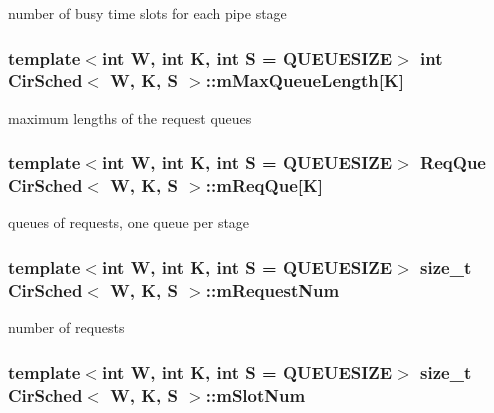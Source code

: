 number of busy time slots for each pipe stage 

\hypertarget{classCirSched_aef4a2f15ecdea422b3b3c2e271f2a41d}{
\subsubsection[{m\-Max\-Queue\-Length}]{\setlength{\rightskip}{0pt plus 5cm}template$<$int W, int K, int S = Q\-U\-E\-U\-E\-S\-I\-Z\-E$>$ int {\bf Cir\-Sched}$<$ {\bf W}, K, S $>$\-::m\-Max\-Queue\-Length\mbox{[}K\mbox{]}\hspace{0.3cm}{\ttfamily [private]}}}\label{classCirSched_aef4a2f15ecdea422b3b3c2e271f2a41d}


maximum lengths of the request queues 

\hypertarget{classCirSched_a626135d70cbd18b7031a7eed0aafabd5}{
\subsubsection[{m\-Req\-Que}]{\setlength{\rightskip}{0pt plus 5cm}template$<$int W, int K, int S = Q\-U\-E\-U\-E\-S\-I\-Z\-E$>$ {\bf Req\-Que} {\bf Cir\-Sched}$<$ {\bf W}, K, S $>$\-::m\-Req\-Que\mbox{[}K\mbox{]}}}\label{classCirSched_a626135d70cbd18b7031a7eed0aafabd5}


queues of requests, one queue per stage 

\hypertarget{classCirSched_acd7ba9fa2e160b2fea6e5600820f93f6}{
\subsubsection[{m\-Request\-Num}]{\setlength{\rightskip}{0pt plus 5cm}template$<$int W, int K, int S = Q\-U\-E\-U\-E\-S\-I\-Z\-E$>$ size\-\_\-t {\bf Cir\-Sched}$<$ {\bf W}, K, S $>$\-::m\-Request\-Num\hspace{0.3cm}{\ttfamily [private]}}}\label{classCirSched_acd7ba9fa2e160b2fea6e5600820f93f6}


number of requests 

\hypertarget{classCirSched_abfff83dd8fcbea59762014b06620ac69}{
\subsubsection[{m\-Slot\-Num}]{\setlength{\rightskip}{0pt plus 5cm}template$<$int W, int K, int S = Q\-U\-E\-U\-E\-S\-I\-Z\-E$>$ size\-\_\-t {\bf Cir\-Sched}$<$ {\bf W}, K, S $>$\-::m\-Slot\-Num\hspace{0.3cm}{\ttfamily [private]}}}\label{classCirSched_abfff83dd8fcbea59762014b06620ac69}


